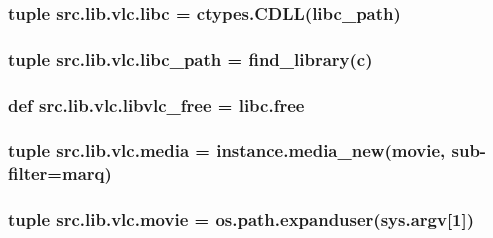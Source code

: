 \subsubsection[{libc}]{\setlength{\rightskip}{0pt plus 5cm}tuple src.\+lib.\+vlc.\+libc = ctypes.\+C\+D\+L\+L({\bf libc\+\_\+path})}\label{namespacesrc_1_1lib_1_1vlc_a0e3abf116434381009146b4b6f13bd88}
\hypertarget{namespacesrc_1_1lib_1_1vlc_a0b02a384aff2a608ba94b4c351017c31}{}
\subsubsection[{libc\+\_\+path}]{\setlength{\rightskip}{0pt plus 5cm}tuple src.\+lib.\+vlc.\+libc\+\_\+path = find\+\_\+library(\textquotesingle{}c\textquotesingle{})}\label{namespacesrc_1_1lib_1_1vlc_a0b02a384aff2a608ba94b4c351017c31}
\hypertarget{namespacesrc_1_1lib_1_1vlc_ac5c23a969b0c59dabc7a2ea0860ebaab}{}
\subsubsection[{libvlc\+\_\+free}]{\setlength{\rightskip}{0pt plus 5cm}def src.\+lib.\+vlc.\+libvlc\+\_\+free = libc.\+free}\label{namespacesrc_1_1lib_1_1vlc_ac5c23a969b0c59dabc7a2ea0860ebaab}
\hypertarget{namespacesrc_1_1lib_1_1vlc_a085d8a749055453f84bbd21037599b3c}{}
\subsubsection[{media}]{\setlength{\rightskip}{0pt plus 5cm}tuple src.\+lib.\+vlc.\+media = instance.\+media\+\_\+new({\bf movie}, \textquotesingle{}sub-\/filter=marq\textquotesingle{})}\label{namespacesrc_1_1lib_1_1vlc_a085d8a749055453f84bbd21037599b3c}
\hypertarget{namespacesrc_1_1lib_1_1vlc_acb04cca35b5c624c7ec2df52c6b7efdd}{}
\subsubsection[{movie}]{\setlength{\rightskip}{0pt plus 5cm}tuple src.\+lib.\+vlc.\+movie = os.\+path.\+expanduser(sys.\+argv\mbox{[}1\mbox{]})}\label{namespacesrc_1_1lib_1_1vlc_acb04cca35b5c624c7ec2df52c6b7efdd}
\hypertarget{namespacesrc_1_1lib_1_1vlc_a3245e13ab40950beac9bda1e4091c4fa}{}
